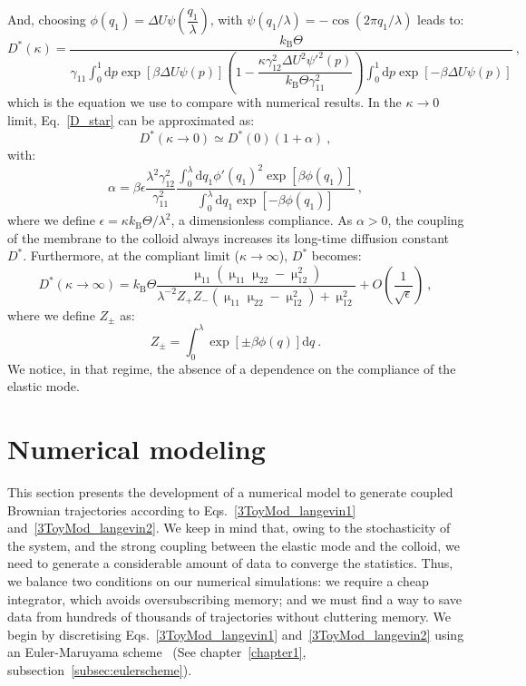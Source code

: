 And, choosing $\phi(q_1) = \Delta U \psi\left(\dfrac{q_1}{\lambda}\right)$, with $\psi \left( q_1 / \lambda\right) = - \cos \left( 2 \pi q_1 / \lambda\right)$ leads to:
\begin{equation}
    D^*(\kappa) = \dfrac{k_\mathrm{B}\Theta}{\gamma_{11}\int_{0}^{1} \mathrm{d}p \exp[\beta\Delta U \psi(p)] \left(1 - \dfrac{\kappa \gamma_{12}^2 \Delta U^2\psi'^2(p)}{k_\mathrm{B}\Theta \gamma_{11}^2}\right) \int_{0}^{1} \mathrm{d}p \exp[-\beta \Delta U\psi(p)]}~,
    \label{D_star}
\end{equation}
which is the equation we use to compare with numerical results. In the $\kappa \to 0$ limit, Eq.~\ref{D_star} can be approximated as:
\begin{equation}
    \boxed{
    D^*(\kappa \to 0) \simeq D^*(0) (1 + \alpha)}~,
    \label{eq:dstar_stiff}
\end{equation}
with:
\begin{equation}
    \alpha = \beta \epsilon \dfrac{\lambda^2 \gamma_{12}^2}{\gamma_{11}^2} \dfrac{\int_{0}^{\lambda} \mathrm{d}q_1 \phi'(q_1)^2 \exp[\beta \phi(q_1)]}{\int_{0}^{\lambda} \mathrm{d}q_1 \exp[-\beta \phi(q_1)]}~,
\end{equation}
where we define $\epsilon = \kappa k_\mathrm{B}\Theta/\lambda^2$, a dimensionless compliance. As $\alpha > 0$, the coupling of the membrane to the colloid always increases its long-time diffusion constant $D^*$. Furthermore, at the compliant limit ($\kappa \to \infty$), $D^*$ becomes:
\begin{equation}
    \boxed{
    D^* (\kappa \to \infty ) = k_\mathrm{B}\Theta \dfrac{\upmu_{11}(\upmu_{11}\upmu_{22} - \upmu_{12}^2)}{\lambda^{-2}Z_+Z_-(\upmu_{11}\upmu_{22} - \upmu_{12}^2) + \upmu_{12}^2} + O\left(\dfrac{1}{\sqrt{\epsilon}}\right)
    \label{D_star_compliant}}~,
\end{equation}
where we define $Z_\pm$ as:
\begin{equation}
Z_\pm = \int_{0}^{\lambda} \exp[\pm \beta \phi(q)]\mathrm{d}q~.
\end{equation}
We notice, in that regime, the absence of a dependence on the compliance of the elastic mode.

\section{Numerical modeling}
This section presents the development of a numerical model to generate coupled Brownian trajectories according to Eqs.~\ref{3ToyMod_langevin1} and~\ref{3ToyMod_langevin2}. We keep in mind that, owing to the stochasticity of the system, and the strong coupling between the elastic mode and the colloid, we need to generate a considerable amount of data to converge the statistics. Thus, we balance two conditions on our numerical simulations: we require a cheap integrator, which avoids oversubscribing memory; and we must find a way to save data from hundreds of thousands of trajectories without cluttering memory. We begin by discretising Eqs.~\ref{3ToyMod_langevin1} and~\ref{3ToyMod_langevin2} using an Euler-Maruyama scheme~\cite{Maruyama1955} (See chapter~\ref{chapter1}, subsection~\ref{subsec:eulerscheme}).


